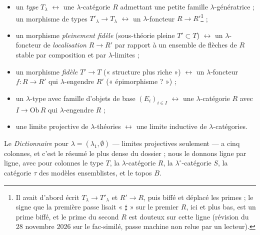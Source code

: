 \documentclass[11pt,a4paper]{article}
\begin{document}
\begin{itemize}
\item un \emph{type} $T_{\lambda}$ $\longleftrightarrow$ une $\lambda$-catégorie
$R$ admettant une petite famille $\lambda$-génératrice ; un morphisme de
types $T'_{\lambda} \to T_{\lambda}$ $\longleftrightarrow$ un $\lambda$-foncteur
$R \to R'$\footnote{Il avait d'abord écrit $T_{\lambda} \to T'_{\lambda}$ et
$R' \to R$, puis biffé et déplacé les primes ; le signe que la première passe
lisait « $\sharp$ » sur le premier $R$, ici et plus bas, est un prime biffé,
et le prime du second $R$ est douteux sur cette ligne (révision du 28 novembre 2026 sur le fac-similé, passe machine non relue par un lecteur).} ;
\item un morphisme \emph{pleinement fidèle} (sous-théorie pleine $T' \subset
T$) $\longleftrightarrow$ un $\lambda$-foncteur de \emph{localisation} $R \to R'$
par rapport à un ensemble de flèches de $R$ stable par composition et par
$\lambda$-limites ;
\item un morphisme \emph{fidèle} $T' \to T$ (« structure plus riche »)
$\longleftrightarrow$ un $\lambda$-foncteur $f : R \to R'$ qui $\lambda$-engendre
$R'$ (« épimorphisme ? ») ;
\item un $\lambda$-type avec famille d'objets de base $(E_{i})_{i \in I}$
$\longleftrightarrow$ une $\lambda$-catégorie $R$ avec $I \to \mathrm{Ob}\,R$
qui $\lambda$-engendre $R$ ;
\item une limite projective de $\lambda$-théories $\longleftrightarrow$ une
limite inductive de $\lambda$-catégories.
\end{itemize}

Le \emph{Dictionnaire} pour $\lambda = (\lambda_{1}, \emptyset)$ — limites
projectives seulement — a cinq colonnes, et c'est le résumé le plus dense
du dossier ; nous le donnons ligne par ligne, avec pour colonnes le type
$T$, la $\lambda$-catégorie $R$, la $\lambda^{\circ}$-catégorie $S$, la
catégorie $\tau$ des modèles ensemblistes, et le topos $B$.
\end{document}
